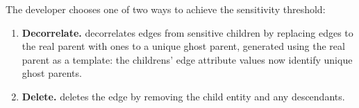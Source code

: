 
The developer chooses one of two ways to achieve the sensitivity threshold: 
\begin{enumerate}
    \item \textbf{Decorrelate.}
    \sys decorrelates edges from sensitive children by replacing edges to the real parent with
        ones to a unique ghost parent, generated using the real parent as a template:
        the childrens' edge attribute values now identify unique ghost parents. 

\item \textbf{Delete.}
    \sys deletes the edge by removing the child entity and any descendants. 
\end{enumerate}



\iffalse
